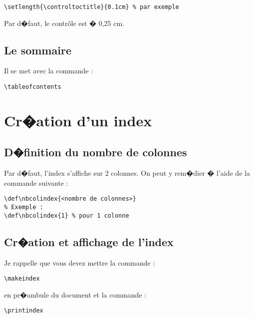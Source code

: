 \documentclass[ams,openany,10pt,presentation,latin1]{mathbook}
\begin{document}
\medskip

\begin{lstlisting}
\setlength{\controltoctitle}{0.1cm} % par exemple
\end{lstlisting}

\medskip

Par d�faut, le contr\^ole est � 0,25 cm.

\subsection{Le sommaire}

Il se met avec la commande :

\medskip

\begin{lstlisting}
\tableofcontents
\end{lstlisting}


\section{Cr�ation d'un index}

\subsection{D�finition du nombre de colonnes}

Par d�faut, l'index s'affiche sur 2 colonnes. On peut y rem�dier � l'aide de la commande suivante :

\medskip

\begin{lstlisting}
\def\nbcolindex{<nombre de colonnes>}
% Exemple :
\def\nbcolindex{1} % pour 1 colonne
\end{lstlisting}

\subsection{Cr�ation et affichage de l'index}

Je rappelle que vous devez mettre la commande  :

\medskip

\begin{lstlisting}
\makeindex
\end{lstlisting}

\medskip

en pr�ambule du document et la commande :

\medskip

\begin{lstlisting}
\printindex
\end{lstlisting}
\end{document}
